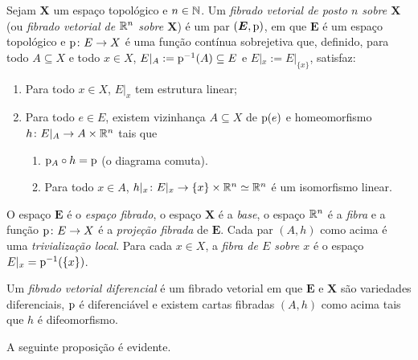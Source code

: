 \begin{definition}
Sejam $\bm X$ um espaço topológico e $n \in \mathbb{N}$. Um \emph{fibrado vetorial de posto $n$ sobre $\bm X$} (ou \emph{fibrado vetorial de $\mathbb{R}^n$ sobre $\bm X$}) é um par $(\bm E,\mathrm{p})$, em que $\bm E$ é um espaço topológico e $\mathrm{p}\colon E \to X$ é uma função contínua sobrejetiva que, definido, para todo $A \subseteq X$ e todo $x \in X$, $E|_A := \mathrm{p}^{-1}(A) \subseteq E$ e $E|_x := E|_{\{x\}}$, satisfaz:
	\begin{enumerate}
	\item Para todo $x \in X$, $E|_x$ tem estrutura linear;
	\item Para todo $e \in E$, existem vizinhança $A \subseteq X$ de $\mathrm{p}(e)$ e homeomorfismo $h\colon E|_A \to A \times \mathbb{R}^n$ tais que
		\begin{enumerate}
		\item $\mathrm{p}_A \circ h = \mathrm{p}$ (o diagrama comuta).
\begin{figure}
\centering
{}
\end{figure}

		\item Para todo $x \in A$, $h|_x\colon E|_x \to \{x\} \times \mathbb{R}^n \simeq \mathbb{R}^n$ é um isomorfismo linear.
		\end{enumerate}
	\end{enumerate}
O espaço $\bm E$ é o \emph{espaço fibrado}, o espaço $\bm X$ é a \emph{base}, o espaço $\mathbb{R}^n$ é a \emph{fibra} e a função $\mathrm{p}\colon E \to X$ é a \emph{projeção fibrada} de $\bm E$. Cada par $(A,h)$ como acima é uma \emph{trivialização local}. Para cada $x \in X$,  a \emph{fibra de $E$ sobre $x$} é o espaço $E|_x = \mathrm{p}^{-1}(\{x\})$.

Um \emph{fibrado vetorial diferencial} é um fibrado vetorial em que $\bm E$ e $\bm X$ são variedades diferenciais, $\mathrm{p}$ é diferenciável e existem cartas fibradas $(A,h)$ como acima tais que $h$ é difeomorfismo.
\end{definition}

A seguinte proposição é evidente.

